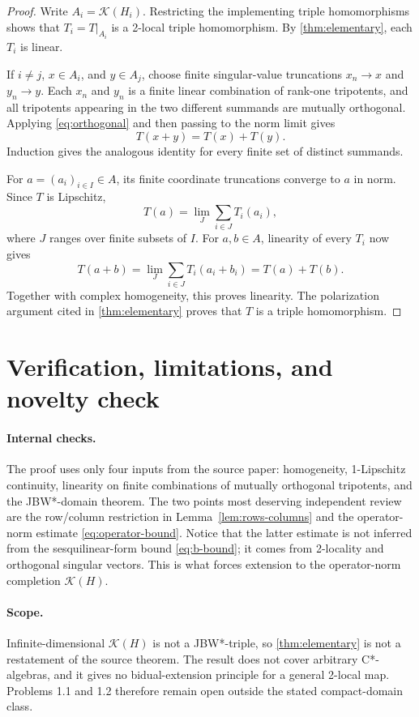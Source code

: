 \documentclass[11pt]{article}
\theoremstyle{remark}
\newcommand{\K}{\mathcal K}
\begin{document}
\begin{proof}
Write $A_i=\K(H_i)$.  Restricting the implementing triple homomorphisms shows
that $T_i=T|_{A_i}$ is a 2-local triple homomorphism.  By
\cref{thm:elementary}, each $T_i$ is linear.

If $i\neq j$, $x\in A_i$, and $y\in A_j$, choose finite singular-value
truncations $x_n\to x$ and $y_n\to y$.  Each $x_n$ and $y_n$ is a finite
linear combination of rank-one tripotents, and all tripotents appearing in
the two different summands are mutually orthogonal.  Applying
\eqref{eq:orthogonal} and then passing to the norm limit gives
\begin{equation}\label{eq:cross-add}
 T(x+y)=T(x)+T(y).
\end{equation}
Induction gives the analogous identity for every finite set of distinct
summands.

For $a=(a_i)_{i\in I}\in A$, its finite coordinate truncations converge to
$a$ in norm.  Since $T$ is Lipschitz,
\[
 T(a)=\lim_{J}\sum_{i\in J}T_i(a_i),
\]
where $J$ ranges over finite subsets of $I$.  For $a,b\in A$, linearity of
every $T_i$ now gives
\[
 T(a+b)=\lim_J\sum_{i\in J}T_i(a_i+b_i)
       =T(a)+T(b).
\]
Together with complex homogeneity, this proves linearity.  The polarization
argument cited in \cref{thm:elementary} proves that $T$ is a triple
homomorphism.
\end{proof}

\section{Verification, limitations, and novelty check}

\paragraph{Internal checks.}
The proof uses only four inputs from the source paper: homogeneity,
1-Lipschitz continuity, linearity on finite combinations of mutually
orthogonal tripotents, and the JBW*-domain theorem.  The two points most
deserving independent review are the row/column restriction in
Lemma~\ref{lem:rows-columns} and the operator-norm estimate
\eqref{eq:operator-bound}.  Notice that the latter estimate is not inferred
from the sesquilinear-form bound \eqref{eq:b-bound}; it comes from 2-locality
and orthogonal singular vectors.  This is what forces extension to the
operator-norm completion $\K(H)$.

\paragraph{Scope.}
Infinite-dimensional $\K(H)$ is not a JBW*-triple, so
\cref{thm:elementary} is not a restatement of the source theorem.  The result
does not cover arbitrary C*-algebras, and it gives no bidual-extension
principle for a general 2-local map.  Problems 1.1 and 1.2 therefore remain
open outside the stated compact-domain class.
\end{document}
